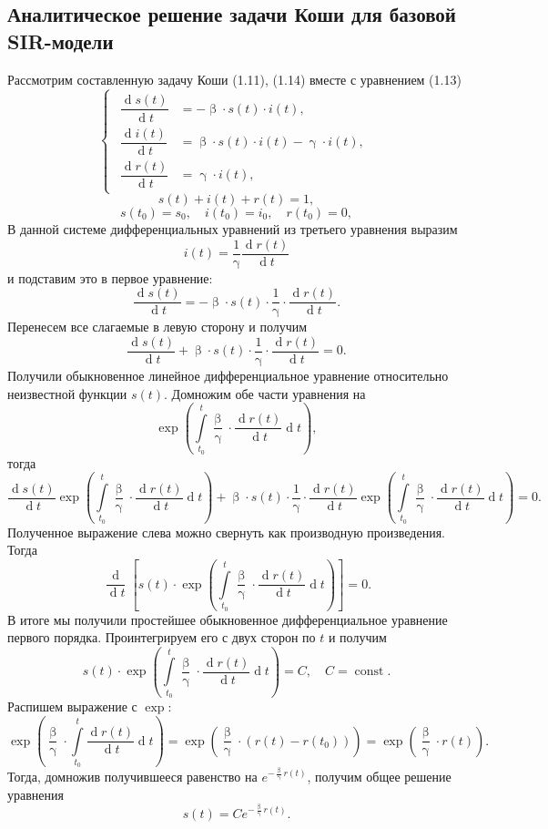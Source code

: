 \documentclass[a4paper, 14pt]{extreport}
\numberwithin{equation}{section}
\renewcommand{\beta}{\upbeta}
\renewcommand{\gamma}{\upgamma}
\renewcommand{\d}{\operatorname{d}}
\begin{document}
	\subsection{Аналитическое решение задачи Коши для базовой SIR-модели}
	Рассмотрим составленную задачу Коши (1.11), (1.14) вместе с уравнением (1.13)
	$$
	\left\{ 
	\begin{gathered} 
		\begin{aligned}
			\dfrac {\d s(t)}{\d t} &= -\beta \cdot s(t) \cdot i(t),\\
			\dfrac{\d i(t)}{\d t} &= \beta \cdot s(t)\cdot i(t) - \gamma\cdot i(t),\\
			\dfrac{\d r(t)}{\d t} &= \gamma\cdot i(t),
		\end{aligned}
	\end{gathered} 
	\right.
	$$
	$$
	s(t) + i(t) + r(t) = 1,
	$$
	$$
	s(t_0) = s_0,\quad i(t_0) = i_0,\quad r(t_0) = 0,
	$$
	В данной системе дифференциальных уравнений из третьего уравнения выразим $$i(t) = \dfrac1\gamma\dfrac{\d r(t)}{\d t}$$ и подставим это в первое уравнение:
	$$\dfrac {\d s(t)}{\d t} = -\beta \cdot s(t) \cdot \dfrac1\gamma\cdot\dfrac{\d r(t)}{\d t}.$$
	Перенесем все слагаемые в левую сторону и получим 
	$$\dfrac {\d s(t)}{\d t} +\beta \cdot s(t) \cdot \dfrac1\gamma\cdot\dfrac{\d r(t)}{\d t} = 0.$$
	Получили обыкновенное линейное дифференциальное уравнение относительно неизвестной функции $s(t)$. Домножим обе части уравнения на $$\exp \left(\int\limits_{t_0}^t \dfrac \beta \gamma\cdot \dfrac{\d r(t)}{\d t} \d t \right),$$
	тогда
	$$\dfrac {\d s(t)}{\d t} \exp \left(\int\limits_{t_0}^t \dfrac \beta \gamma\cdot \dfrac{\d r(t)}{\d t} \d t \right) +\beta \cdot s(t) \cdot \dfrac1\gamma\cdot\dfrac{\d r(t)}{\d t} \exp \left(\int\limits_{t_0}^t \dfrac \beta \gamma\cdot \dfrac{\d r(t)}{\d t} \d t \right) = 0.$$
	Полученное выражение слева можно свернуть как производную произведения. Тогда 
	$$\dfrac{\d}{\d t}\left[s(t)\cdot \exp \left(\int\limits_{t_0}^t \dfrac \beta \gamma\cdot \dfrac{\d r(t)}{\d t} \d t \right)\right] = 0.$$
	В итоге мы получили простейшее обыкновенное дифференциальное уравнение первого порядка. Проинтегрируем его с двух сторон по $t$ и получим
	$$s(t)\cdot \exp \left(\int\limits_{t_0}^t \dfrac \beta \gamma\cdot \dfrac{\d r(t)}{\d t} \d t \right) = C,\quad C = \operatorname{const}.$$
	Распишем выражение с $\exp$: $$\exp \left(\dfrac \beta \gamma\cdot\int\limits_{t_0}^t  \dfrac{\d r(t)}{\d t} \d t \right) = \exp \left(\dfrac \beta \gamma\cdot( r(t) - r(t_0))\right) = \exp \left(\dfrac \beta \gamma\cdot r(t)\right).$$
	Тогда, домножив получившееся равенство на $e^{-\frac\beta \gamma r(t)}$, получим общее решение уравнения $$s(t) = C e^{-\frac\beta \gamma r(t)}.$$
\end{document}
